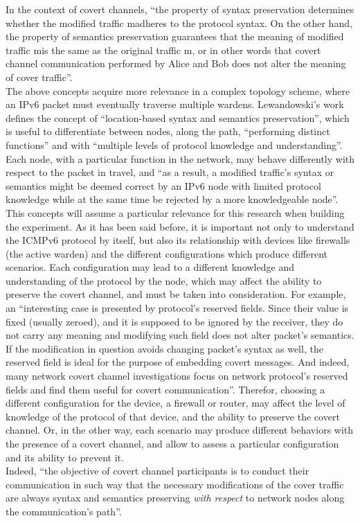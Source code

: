 \documentclass[12pt]{article}
\begin{document}
In the context of covert channels, ``the property of syntax preservation determines whether the modified traffic m\textprime\hspace{2pt}adheres to the protocol syntax. On the other hand, the property of semantics 
preservation guarantees that the meaning of modified traffic m\textprime\hspace{2pt}is the same as the original traffic m, or in other words that covert channel communication performed by Alice and Bob does not alter the 
meaning of cover traffic''.\\
The above concepts acquire more relevance in a complex topology scheme, where an IPv6 packet must eventually traverse multiple wardens. Lewandowski's work defines the concept of ``location-based syntax and semantics 
preservation'', which is useful to differentiate between nodes, along the path, ``performing distinct functions'' and with ``multiple levels of protocol knowledge and understanding''. Each node, with a particular function 
in the network, may behave differently with respect to the packet in travel, and ``as a result, a modified traffic’s syntax or semantics might be deemed correct by an IPv6 node with limited protocol knowledge while at 
the same time be rejected by a more knowledgeable node''.\\
This concepts will assume a particular relevance for this research when building the experiment. As it has been said before, it is important not only to understand the ICMPv6 protocol by itself, but also its relationship 
with devices like firewalls (the active warden) and the different configurations which produce different scenarios. Each configuration may lead to a different knowledge and understanding of the protocol by the node, which 
may affect the ability to preserve the covert channel, and must be taken into consideration. For example, an ``interesting case is presented by protocol’s reserved fields. Since their value is fixed (usually zeroed), and 
it is supposed to be ignored by the receiver, they do not carry any meaning and modifying such field does not alter packet’s semantics. If the modification in question avoids changing packet’s syntax as well, the 
reserved field is ideal for the purpose of embedding covert messages. And indeed, many network covert channel investigations focus on network protocol’s reserved fields and find them useful for covert communication''.
Therefor, choosing a different configuration for the device, a firewall or router, may affect the level of knowledge of the protocol of that device, and the ability to preserve the covert channel. Or, in the other way, 
each scenario may produce different behaviors with the presence of a covert channel, and allow to assess a particular configuration and its ability to prevent it.\\
Indeed, ``the objective of covert channel participants is to conduct their communication in such way that the necessary modifications of the cover traffic are always syntax and semantics preserving \textit{with respect} 
to network nodes along the communication’s path''.
\end{document}
